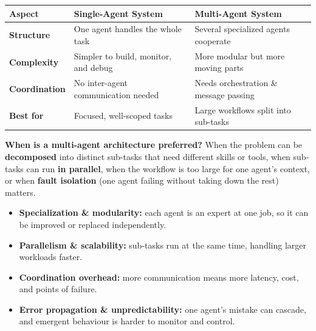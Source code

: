 \documentclass[11pt,a4paper]{article}
\begin{document}
\begin{center}
\begin{tabular}{@{}>{\bfseries}p{2.6cm}p{5.3cm}p{5.3cm}@{}}
\toprule
\rowcolor{primary!15}
\textbf{Aspect} & \textbf{Single-Agent System} & \textbf{Multi-Agent System} \\
\midrule
Structure & One agent handles the whole task & Several specialized agents cooperate \\
Complexity & Simpler to build, monitor, and debug & More modular but more moving parts \\
Coordination & No inter-agent communication needed & Needs orchestration \& message passing \\
Best for & Focused, well-scoped tasks & Large workflows split into sub-tasks \\
\bottomrule
\end{tabular}
\end{center}

\textbf{When is a multi-agent architecture preferred?} When the problem can be \textbf{decomposed} into distinct sub-tasks that need different skills or tools, when sub-tasks can run \textbf{in parallel}, when the workflow is too large for one agent's context, or when \textbf{fault isolation} (one agent failing without taking down the rest) matters.

\vspace{2pt}
\begin{minipage}[t]{0.49\textwidth}
\begin{conceptbox}
\begin{itemize}[leftmargin=*,topsep=1pt,itemsep=2pt]
  \item \textbf{Specialization \& modularity:} each agent is an expert at one job, so it can be improved or replaced independently.
  \item \textbf{Parallelism \& scalability:} sub-tasks run at the same time, handling larger workloads faster.
\end{itemize}
\end{conceptbox}
\end{minipage}\hfill
\begin{minipage}[t]{0.49\textwidth}
\begin{warnbox}
\begin{itemize}[leftmargin=*,topsep=1pt,itemsep=2pt]
  \item \textbf{Coordination overhead:} more communication means more latency, cost, and points of failure.
  \item \textbf{Error propagation \& unpredictability:} one agent's mistake can cascade, and emergent behaviour is harder to monitor and control.
\end{itemize}
\end{warnbox}
\end{minipage}
\end{document}

